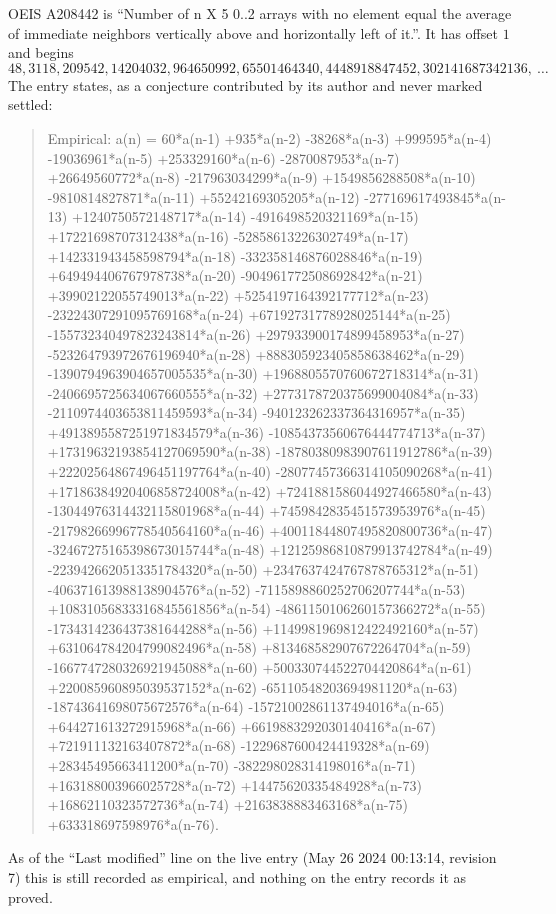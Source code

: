 \documentclass[11pt,a4paper]{article}
\theoremstyle{plain}
\theoremstyle{definition}
\begin{document}
OEIS A208442 is ``Number of n X 5 0..2 arrays with no element equal the average of immediate neighbors vertically above and horizontally left of it.''. It has offset $1$ and begins
\[
48, 3118, 209542, 14204032, 964650992, 65501464340, 4448918847452, 302141687342136,\ \dots
\]
The entry states, as a conjecture contributed by its author and never marked settled:
\begin{quote}
Empirical: a(n) = 60*a(n-1) +935*a(n-2) -38268*a(n-3) +999595*a(n-4) -19036961*a(n-5) +253329160*a(n-6) -2870087953*a(n-7) +26649560772*a(n-8) -217963034299*a(n-9) +1549856288508*a(n-10) -9810814827871*a(n-11) +55242169305205*a(n-12) -277169617493845*a(n-13) +1240750572148717*a(n-14) -4916498520321169*a(n-15) +17221698707312438*a(n-16) -52858613226302749*a(n-17) +142331943458598794*a(n-18) -332358146876028846*a(n-19) +649494406767978738*a(n-20) -904961772508692842*a(n-21) +39902122055749013*a(n-22) +5254197164392177712*a(n-23) -23224307291095769168*a(n-24) +67192731778928025144*a(n-25) -155732340497823243814*a(n-26) +297933900174899458953*a(n-27) -523264793972676196940*a(n-28) +888305923405858638462*a(n-29) -1390794963904657005535*a(n-30) +1968805570760672718314*a(n-31) -2406695725634067660555*a(n-32) +2773178720375699004084*a(n-33) -2110974403653811459593*a(n-34) -940123262337364316957*a(n-35) +4913895587251971834579*a(n-36) -10854373560676444774713*a(n-37) +17319632193854127069590*a(n-38) -18780380983907611912786*a(n-39) +22202564867496451197764*a(n-40) -28077457366314105090268*a(n-41) +17186384920406858724008*a(n-42) +7241881586044927466580*a(n-43) -13044976314432115801968*a(n-44) +7459842835451573953976*a(n-45) -21798266996778540564160*a(n-46) +40011844807495820800736*a(n-47) -32467275165398673015744*a(n-48) +12125986810879913742784*a(n-49) -2239426620513351784320*a(n-50) +2347637424767878765312*a(n-51) -406371613988138904576*a(n-52) -7115898860252706207744*a(n-53) +10831056833316845561856*a(n-54) -4861150106260157366272*a(n-55) -1734314236437381644288*a(n-56) +1149981969812422492160*a(n-57) +631064784204799082496*a(n-58) +813468582907672264704*a(n-59) -1667747280326921945088*a(n-60) +500330744522704420864*a(n-61) +220085960895039537152*a(n-62) -65110548203694981120*a(n-63) -18743641698075672576*a(n-64) -15721002861137494016*a(n-65) +644271613272915968*a(n-66) +6619883292030140416*a(n-67) +721911132163407872*a(n-68) -1229687600424419328*a(n-69) +28345495663411200*a(n-70) -382298028314198016*a(n-71) +163188003966025728*a(n-72) +14475620335484928*a(n-73) +16862110323572736*a(n-74) +2163838883463168*a(n-75) +633318697598976*a(n-76).
\end{quote}
As of the ``Last modified'' line on the live entry (May 26 2024 00:13:14, revision 7) this is still
recorded as empirical, and nothing on the entry records it as proved.
\end{document}
